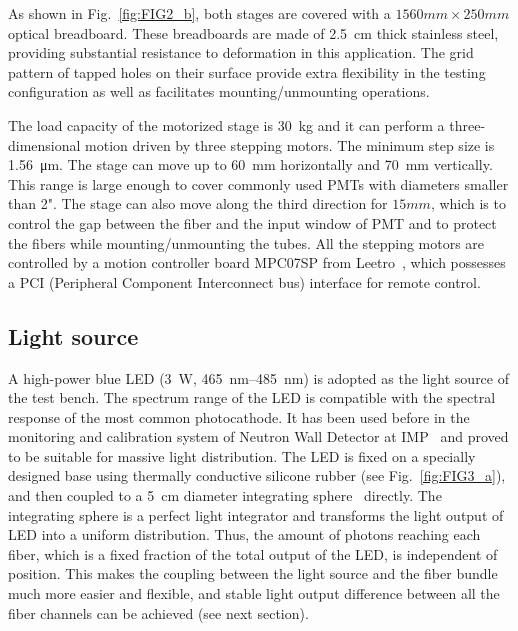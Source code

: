 \documentclass{nst}
\begin{document}
As shown in Fig.~\ref{fig:FIG2_b}, both stages are covered with a $1560mm\times250mm$ optical breadboard. 
These breadboards are made of \SI{2.5}{cm} thick stainless steel, providing substantial resistance to deformation in this application. 
The grid pattern of tapped holes on their surface provide extra flexibility in the testing configuration as well as facilitates mounting/unmounting operations.

The load capacity of the motorized stage is \SI{30}{\kilo\gram} and it can perform a three-dimensional motion driven by three stepping motors. The minimum step size is \SI{1.56}{\micro\meter}.
The stage can move up to \SI{60}{\milli\meter} horizontally and \SI{70}{\milli\meter} vertically. This range is large enough to cover commonly used PMTs with diameters smaller than 2".
The stage can also move along the third direction for $15mm$, which is to control the gap between the fiber and the input window of PMT and to protect the fibers while mounting/unmounting the tubes.
All the stepping motors are controlled by a motion controller board MPC07SP from Leetro~\cite{leetro}, which possesses a PCI (Peripheral Component Interconnect bus) interface for remote control.

\subsection{Light source}
\label{sec:light_source}

A high-power blue LED (\SI{3}{\watt}, \SIrange{465}{485}{\nano\meter}) is adopted as the light source of the test bench.
The spectrum range of the LED is compatible with the spectral response of the most common photocathode.
It has been used before in the monitoring and calibration system of Neutron Wall Detector at IMP~\cite{yuyuhong_led} and proved to be suitable for massive light distribution.
The LED is fixed on a specially designed base using thermally conductive silicone rubber (see Fig.~\ref{fig:FIG3_a}), and then coupled to a \SI{5}{\centi\meter} diameter integrating sphere~\cite{integrating_sphere} directly.
The integrating sphere is a perfect light integrator and transforms the light output of LED into a uniform distribution.
Thus, the amount of photons reaching each fiber, which is a fixed fraction of the total output of the LED, is independent of position.
This makes the coupling between the light source and the fiber bundle much more easier and flexible, and stable light output difference between all the fiber channels can be achieved (see next section).
\end{document}
